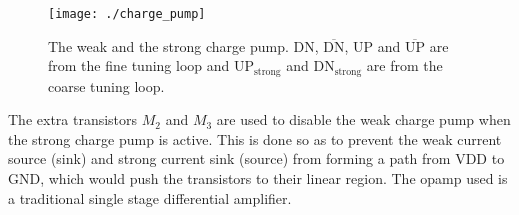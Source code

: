 \documentclass[journal,twoside,letterpaper]{IEEEtran}
\begin{document}
\begin{figure}[h]
\centering
\texttt{[image: ./charge\_pump]}
\caption{The weak and the strong charge pump. DN, $\overline{\text{DN}}$,
UP and $\overline{\text{UP}}$ are from the fine tuning loop and UP$_{\text{strong}}$
and DN$_{\text{strong}}$ are from the coarse tuning loop.}
\label{fig:charge_pump}
\end{figure}


The extra transistors $M_2$ and $M_3$ are used to disable the 
weak charge pump when the strong charge pump is active. This is 
done so as to prevent the weak current source (sink)  and 
strong current sink (source) from forming a path
from VDD to GND, which would push the transistors to their linear region. 
The opamp used is a traditional single stage differential amplifier.
\end{document}
